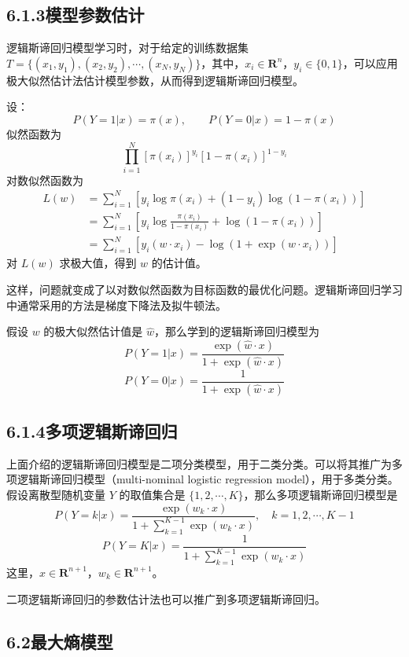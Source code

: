 \documentclass[UTF8,12pt,a4paper,fontset=fandol]{ctexart}
\begin{document}
\subsection*{6.1.3\quad 模型参数估计}

逻辑斯谛回归模型学习时，对于给定的训练数据集 $T=\{(x_1,y_1),(x_2,y_2),\cdots,(x_N,y_N)\}$，其中，$x_i\in\mathbf{R}^n$，$y_i\in\{0,1\}$，可以应用极大似然估计法估计模型参数，从而得到逻辑斯谛回归模型。

设：
\[
P(Y=1|x)=\pi(x),\qquad P(Y=0|x)=1-\pi(x)
\]
似然函数为
\[
\prod_{i=1}^N[\pi(x_i)]^{y_i}[1-\pi(x_i)]^{1-y_i}
\]
对数似然函数为
\[
\begin{aligned}
L(w)&=\sum_{i=1}^N[y_i\log\pi(x_i)+(1-y_i)\log(1-\pi(x_i))]\\
&=\sum_{i=1}^N\left[y_i\log\frac{\pi(x_i)}{1-\pi(x_i)}+\log(1-\pi(x_i))\right]\\
&=\sum_{i=1}^N[y_i(w\cdot x_i)-\log(1+\exp(w\cdot x_i))]
\end{aligned}
\]
对 $L(w)$ 求极大值，得到 $w$ 的估计值。

这样，问题就变成了以对数似然函数为目标函数的最优化问题。逻辑斯谛回归学习中通常采用的方法是梯度下降法及拟牛顿法。

假设 $w$ 的极大似然估计值是 $\hat{w}$，那么学到的逻辑斯谛回归模型为
\[
P(Y=1|x)=\frac{\exp(\hat{w}\cdot x)}{1+\exp(\hat{w}\cdot x)}
\]
\[
P(Y=0|x)=\frac{1}{1+\exp(\hat{w}\cdot x)}
\]

\subsection*{6.1.4\quad 多项逻辑斯谛回归}

上面介绍的逻辑斯谛回归模型是二项分类模型，用于二类分类。可以将其推广为多项逻辑斯谛回归模型（multi-nominal logistic regression model），用于多类分类。假设离散型随机变量 $Y$ 的取值集合是 $\{1,2,\cdots,K\}$，那么多项逻辑斯谛回归模型是
\begin{equation}
P(Y=k|x)=\frac{\exp(w_k\cdot x)}{1+\sum_{k=1}^{K-1}\exp(w_k\cdot x)},\quad k=1,2,\cdots,K-1
\tag{6.7}
\end{equation}
\begin{equation}
P(Y=K|x)=\frac{1}{1+\sum_{k=1}^{K-1}\exp(w_k\cdot x)}
\tag{6.8}
\end{equation}
这里，$x\in\mathbf{R}^{n+1}$，$w_k\in\mathbf{R}^{n+1}$。

二项逻辑斯谛回归的参数估计法也可以推广到多项逻辑斯谛回归。

\subsection*{6.2\quad 最大熵模型}
\end{document}
